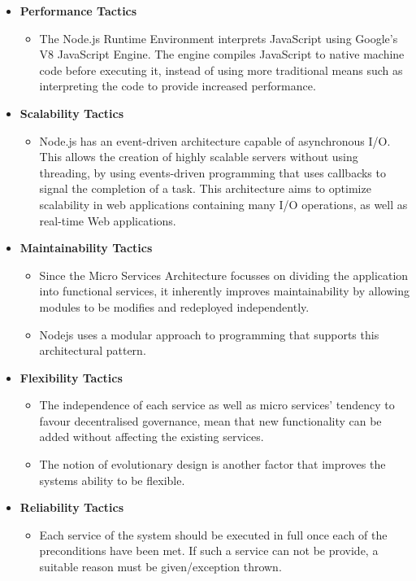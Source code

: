 \documentclass[a4paper,12pt]{article}
\begin{document}
	\begin{itemize}
		\item\textbf{Performance Tactics}
		\begin{itemize}
			\item The Node.js Runtime Environment interprets JavaScript using Google’s V8 JavaScript Engine. The engine compiles JavaScript to native machine code before executing it, instead of using more traditional means such as interpreting the code to provide increased performance.
		\end{itemize}
		
		\item\textbf{Scalability Tactics}
		\begin{itemize}
			\item Node.js has an event-driven architecture capable of asynchronous I/O. This allows the creation of highly scalable servers without using threading, by using events-driven programming that uses callbacks to signal the completion of a task. This architecture aims to optimize scalability in web applications containing many I/O operations, as well as real-time Web applications. 
		\end{itemize}
		
		\item\textbf{Maintainability Tactics}
		\begin{itemize}
			\item Since the Micro Services Architecture focusses on dividing the application into functional services, it inherently improves maintainability by allowing modules to be modifies and redeployed independently.
			\item Nodejs uses a modular approach to programming that supports this architectural pattern. 
		\end{itemize}
		
		\item\textbf{Flexibility Tactics}
		\begin{itemize}
			\item The independence of each service as well as micro services' tendency to favour decentralised governance, mean that new functionality can be added without affecting the existing services.
			\item The notion of evolutionary design is another factor that improves the systems ability to be flexible.
		\end{itemize}
		
		\item\textbf{Reliability Tactics}
		\begin{itemize}
			\item Each service of the system should be executed in full once each of the preconditions have been met. If such a service can not be provide, a suitable reason must be given/exception thrown.
		\end{itemize}
		

\end{itemize}
\end{document}
